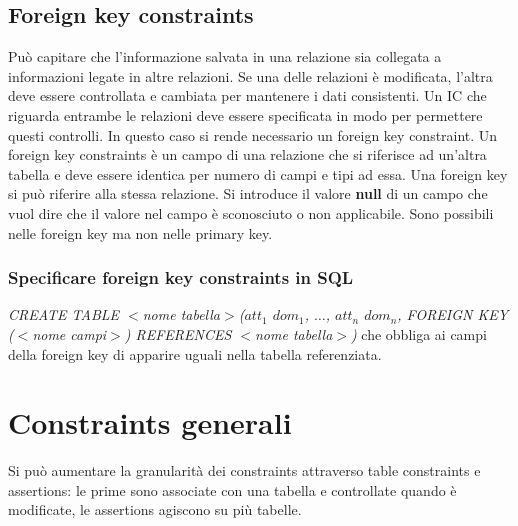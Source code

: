 \subsection{Foreign key constraints}
Pu\`o capitare che l'informazione salvata in una relazione sia collegata a informazioni legate in altre relazioni. Se una delle relazioni \`e modificata, l'altra deve essere controllata e cambiata per mantenere i dati 
consistenti. Un IC che riguarda entrambe le relazioni deve essere specificata in modo per permettere questi controlli. In questo caso si rende necessario un foreign key constraint. Un foreign key constraints
\`e un campo di una relazione che si riferisce ad un'altra tabella e deve essere identica per numero di campi e tipi ad essa. Una foreign key si pu\`o riferire alla stessa relazione. Si introduce il valore \textbf{null}
di un campo che vuol dire che il valore nel campo \`e sconosciuto o non applicabile. Sono possibili nelle foreign key ma non nelle primary key. 
\subsubsection{Specificare foreign key constraints in SQL}
\emph{CREATE TABLE $<$nome tabella$>$($att_1$  $dom_1$, $\dots$, $att_n$  $dom_n$, FOREIGN KEY ($<$nome campi$>$) REFERENCES $<$nome tabella$>$)} che obbliga ai campi della foreign
key di apparire uguali nella tabella referenziata. 
\section{Constraints generali}
Si pu\`o aumentare la granularit\`a dei constraints attraverso table constraints e assertions: le prime sono associate con una tabella e controllate quando \`e modificate, le assertions agiscono su pi\`u tabelle. 
